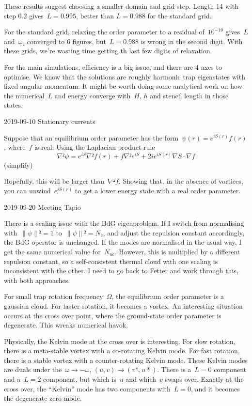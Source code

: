 These results suggest choosing a smaller domain and grid step.  Length 14 with step 0.2 gives~$L=0.995$, better than $L=0.988$ for the standard grid.

For the standard grid, relaxing the order parameter to a residual of~$10^{-10}$ gives~$L$ and~$ω₂$ converged to 6 figures, but~$L=0.988$ is wrong in the second digit.  With these grids, we're wasting time getting th last few digits of relaxation.

For the main simulations, efficiency is a big issue, and there are 4 axes to optimise.  We know that the solutions are roughly harmonic trap eigenstates with fixed angular momentum.  It might be worth doing some analytical work on how the numerical~$L$ and energy converge with~$H$, $h$ and stencil length in those states.

2019-09-10 Stationary currents

Suppose that an equilibrium order parameter has the form~$ψ(r)=e^{iS(r)}f(r)$, where~$f$ is real.  Using the Laplacian product rule
$$∇²ψ=e^{iS}∇²f(r)+f∇²e^{iS}+2ie^{iS(r)}∇S·∇f$$
(simplify)

Hopefully, this will be larger than~$∇²f$.  Showing that, in the absence of vortices, you can unwind~$e^{iS(r)}$ to get a lower energy state with a real order parameter.

2019-09-20 Meeting Tapio

There is a scaling issue with the BdG eigenproblem.  If I switch from normalising with~$∥ψ∥²=1$ to~$∥ψ∥²=N_c$, and adjust the repulsion constant accordingly, the BdG operator is unchanged.  If the modes are normalised in the usual way, I get the same numerical value for~$N_{nc}$.  However, this is multiplied by a different repulsion constant, so a self-consistent thermal cloud with one scaling is inconsistent with the other.  I need to go back to Fetter and work through this, with both approaches.

For small trap rotation frequency~$Ω$, the equilibrium order parameter is a gaussian cloud.  For faster rotation, it becomes a vortex.  An interesting situation occurs at the cross over point, where the ground-state order parameter is degenerate.  This wreaks numerical havok.

Physically, the Kelvin mode at the cross over is interesting.  For slow rotation, there is a meta-stable vortex with a co-rotating Kelvin mode.  For fast rotation, there is a stable vortex with a counter-rotating Kelvin mode.  These Kelvin modes are duals under the~$ω→-ω$, $(u,v)→(v*,u*)$.  There is a~$L=0$ component and a~$L=2$ component, but which is~$u$ and which~$v$ swaps over.  Exactly at the cross over, the “Kelvin” mode has two components with~$L=0$, and it becomes the degenerate zero mode.

